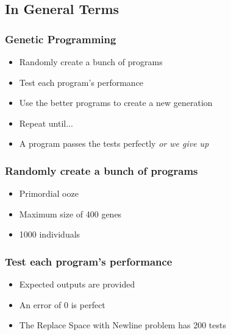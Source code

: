 \documentclass{beamer}
\begin{document}
   \subsection{In General Terms}
   \begin{frame}
     \frametitle{Genetic Programming}
     \begin{itemize}
     \item Randomly create a bunch of programs
     \item Test each program's performance
     \item Use the better programs to create a new generation
     \item Repeat until...
     \item A program passes the tests perfectly \em or \em we give up
     \end{itemize}
   \end{frame}

   \begin{frame}
     \frametitle{Randomly create a bunch of programs}
     \begin{itemize}
     \item Primordial ooze
     \item Maximum size of 400 genes
     \item 1000 individuals
     \end{itemize}
   \end{frame}

   \begin{frame}
     \frametitle{Test each program's performance}
     \begin{itemize}
     \item Expected outputs are provided
     \item An error of 0 is perfect
     \item The Replace Space with Newline problem has 200 tests
     \end{itemize}
   \end{frame}
\end{document}
